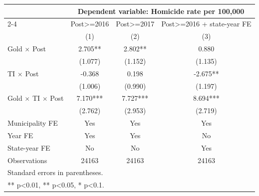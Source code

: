 \begin{tabular}{lccc}
\toprule
& \multicolumn{3}{c}{Dependent variable: Homicide rate per 100,000} \\
\cmidrule(lr){2-4}
& Post>=2016 & Post>=2017 & Post>=2016 + state-year FE \\
& (1) & (2) & (3) \\
\midrule
Gold $\times$ Post & 2.705** & 2.802** & 0.880 \\
 & (1.077) & (1.152) & (1.135) \\
TI $\times$ Post & -0.368 & 0.198 & -2.675** \\
 & (1.006) & (0.990) & (1.197) \\
Gold $\times$ TI $\times$ Post & 7.170*** & 7.727*** & 8.694*** \\
 & (2.762) & (2.953) & (2.719) \\
\midrule
Municipality FE & Yes & Yes & Yes \\
Year FE & Yes & Yes & No \\
State-year FE & No & No & Yes \\
Observations & 24163 & 24163 & 24163 \\
\midrule
\multicolumn{4}{l}{\footnotesize Standard errors in parentheses.} \\
\multicolumn{4}{l}{\footnotesize *** p<0.01, ** p<0.05, * p<0.1.} \\
\bottomrule
\end{tabular}
